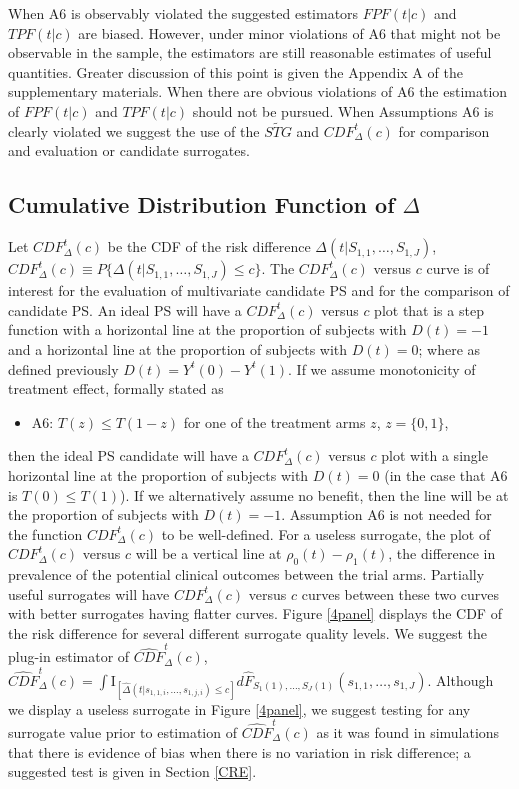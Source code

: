 \documentclass[times, doublespace]{simauth}
\begin{document}
When A6 is observably violated the suggested estimators $FPF(t|c)$ and $TPF(t|c)$ are biased. However, under minor violations of A6 that might not be observable in the sample, the estimators are still reasonable estimates of useful quantities. Greater discussion of this point is given the Appendix A of the supplementary materials. When there are obvious violations of A6 the estimation of $FPF(t|c)$ and $TPF(t|c)$ should not be pursued. When Assumptions A6 is clearly violated we suggest the use of the $\widetilde{STG}$ and $CDF^{t}_{\Delta}(c)$ for comparison and evaluation or candidate surrogates.

\subsection{Cumulative Distribution Function of $\Delta$} \label{CDF}
 Let $CDF^{t}_{\Delta}(c)$ be the CDF of the risk difference $\Delta(t|S_{1,1}, \dots, S_{1,J})$, $CDF^{t}_{\Delta}(c)\equiv P\{\Delta(t|S_{1,1}, \dots, S_{1,J})\leq c\}.$ The $CDF^{t}_{\Delta}(c)$ versus $c$ curve is of interest for the evaluation of multivariate candidate PS and for the comparison of candidate PS. An ideal PS will have a $CDF^{t}_{\Delta}(c)$ versus $c$ plot that is a step function with a horizontal line at the proportion of subjects with $D(t)=-1$ and a horizontal line at the proportion of subjects with $D(t)=0$; where as defined previously $D(t)=Y^{t}(0)-Y^{t}(1)$. If we assume monotonicity of treatment effect, formally stated as
\begin{itemize}
\item A6: $T(z) \leq T(1-z)$ for one of the treatment arms $z$, $z=\{0,1\}$,
\end{itemize}
then the ideal PS candidate will have a $CDF^{t}_{\Delta}(c)$ versus $c$ plot with a single horizontal line at the proportion of subjects with $D(t)=0$ (in the case that A6 is $T(0) \leq T(1)$). If we alternatively assume no benefit, then the line will be at the proportion of subjects with $D(t)=-1$. Assumption A6 is not needed for the function $CDF^{t}_{\Delta}(c)$ to be well-defined. For a useless surrogate, the plot of $CDF^{t}_{\Delta}(c)$ versus $c$ will be a vertical line at $\rho_0(t)-\rho_1(t)$, the difference in prevalence of the potential clinical outcomes between the trial arms. Partially useful surrogates will have $CDF^{t}_{\Delta}(c)$ versus $c$ curves between these two curves with better surrogates having flatter curves. Figure \ref{4panel} displays the CDF of the risk difference for several different surrogate quality levels. We suggest the plug-in estimator of $\widehat{CDF}^{t}_{\Delta}(c)$, $\widehat{CDF}^{t}_{\Delta}(c)=\int{\mathrm{I}_{[\hat{\Delta}(t|s_{1,1,i}, \dots, s_{1,j,i})\leq c]} d\hat{F}_{S_1(1), \ldots, S_J(1)}(s_{1,1}, \dots, s_{1,J})}$. Although we display a useless surrogate in Figure \ref{4panel}, we suggest testing for any surrogate value prior to estimation of $\widehat{CDF}^{t}_{\Delta}(c)$ as it was found in simulations that there is evidence of bias when there is no variation in risk difference; a suggested test is given in Section \ref{CRE}.
\end{document}
